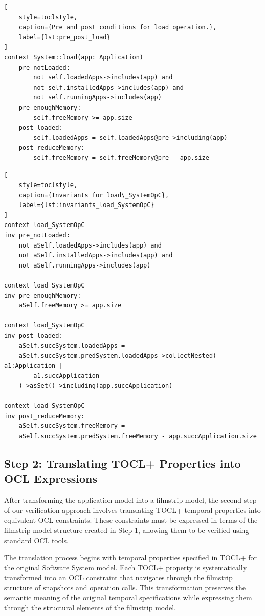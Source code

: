 \begin{lstlisting}[
    style=toclstyle, 
    caption={Pre and post conditions for load operation.}, 
    label={lst:pre_post_load}
]
context System::load(app: Application)
    pre notLoaded: 
        not self.loadedApps->includes(app) and
        not self.installedApps->includes(app) and
        not self.runningApps->includes(app)
    pre enoughMemory: 
        self.freeMemory >= app.size
    post loaded: 
        self.loadedApps = self.loadedApps@pre->including(app)
    post reduceMemory: 
        self.freeMemory = self.freeMemory@pre - app.size
\end{lstlisting}

\begin{lstlisting}[
    style=toclstyle, 
    caption={Invariants for load\_SystemOpC}, 
    label={lst:invariants_load_SystemOpC}
]
context load_SystemOpC 
inv pre_notLoaded:
    not aSelf.loadedApps->includes(app) and 
    not aSelf.installedApps->includes(app) and 
    not aSelf.runningApps->includes(app)

context load_SystemOpC 
inv pre_enoughMemory:
    aSelf.freeMemory >= app.size

context load_SystemOpC 
inv post_loaded:
    aSelf.succSystem.loadedApps = 
    aSelf.succSystem.predSystem.loadedApps->collectNested( a1:Application | 
        a1.succApplication 
    )->asSet()->including(app.succApplication)

context load_SystemOpC 
inv post_reduceMemory:
    aSelf.succSystem.freeMemory = 
    aSelf.succSystem.predSystem.freeMemory - app.succApplication.size
\end{lstlisting}


\subsection{Step 2: Translating TOCL+ Properties into OCL Expressions}

\hspace{1cm} After transforming the application model into a filmstrip model, the 
second step of our verification approach involves translating TOCL+ temporal 
properties into equivalent OCL constraints. These constraints must be expressed in 
terms of the filmstrip model structure created in Step 1, allowing them to be 
verified using standard OCL tools.

The translation process begins with temporal properties specified in TOCL+ for the 
original Software System model. Each TOCL+ property is systematically transformed 
into an OCL constraint that navigates through the filmstrip structure of snapshots 
and operation calls. This transformation preserves the semantic meaning of the 
original temporal specifications while expressing them through the structural 
elements of the filmstrip model.

